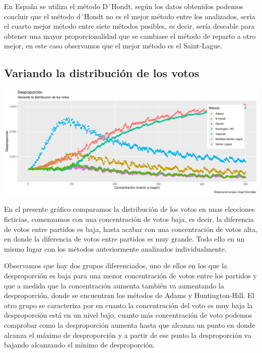 \documentclass[12pt,a4paper,]{book}
\numberwithin{dummy}{section}
\theoremstyle{ocrenumbox}
\theoremstyle{blacknumex}
\theoremstyle{blacknumbox}
\theoremstyle{ocrenum}
\theoremstyle{ocrenum}
\begin{document}
En España se utiliza el método D´Hondt, según los datos obtenidos
podemos concluir que el método d´Hondt no es el mejor método entre los
analizados, sería el cuarto mejor método entre siete métodos posibles,
es decir, sería deseable para obtener una mayor proporcionalidad que se
cambiase el método de reparto a otro mejor, en este caso observamos que
el mejor método es el Saint-Lague.

\hypertarget{variando-la-distribuciuxf3n-de-los-votos}{%
\subsection{Variando la distribución de los
votos}\label{variando-la-distribuciuxf3n-de-los-votos}}

\begin{center}\includegraphics[width=0.95\linewidth]{figurasR/unnamed-chunk-46-1} \end{center}

En el presente gráfico comparamos la distribución de los votos en unas
elecciones ficticias, comenzamos con una concentración de votos baja, es
decir, la diferencia de votos entre partidos es baja, hasta acabar con
una concentración de votos alta, en donde la diferencia de votos entre
partidos es muy grande. Todo ello en un mismo lugar con los métodos
anteriormente analizados individualmente.

Observamos que hay dos grupos diferenciados, uno de ellos en los que la
desproporción es baja para una menor concentración de votos entre los
partidos y que a medida que la concentración aumenta también va
aumentando la desproporción, donde se encuentran los métodos de Adams y
Huntington-Hill. El otro grupo se caracteriza por en cuanto la
concentración del voto es muy baja la desproporción está en un nivel
bajo, cuanto más concentración de voto podemos comprobar como la
desproporción aumenta hasta que alcanza un punto en donde alcanza el
máximo de desproporción y a partir de ese punto la desproporción va
bajando alcanzando el mínimo de desproporción.
\end{document}
